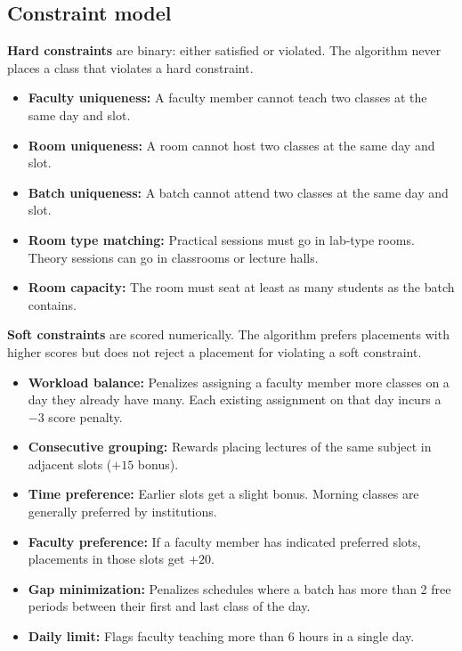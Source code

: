 \documentclass[conference]{IEEEtran}
\begin{document}
\subsection{Constraint model}

\textbf{Hard constraints} are binary: either satisfied or violated. The algorithm never places a class that violates a hard constraint.

\begin{itemize}
\item \textbf{Faculty uniqueness:} A faculty member cannot teach two classes at the same day and slot.
\item \textbf{Room uniqueness:} A room cannot host two classes at the same day and slot.
\item \textbf{Batch uniqueness:} A batch cannot attend two classes at the same day and slot.
\item \textbf{Room type matching:} Practical sessions must go in lab-type rooms. Theory sessions can go in classrooms or lecture halls.
\item \textbf{Room capacity:} The room must seat at least as many students as the batch contains.
\end{itemize}

\textbf{Soft constraints} are scored numerically. The algorithm prefers placements with higher scores but does not reject a placement for violating a soft constraint.

\begin{itemize}
\item \textbf{Workload balance:} Penalizes assigning a faculty member more classes on a day they already have many. Each existing assignment on that day incurs a $-3$ score penalty.
\item \textbf{Consecutive grouping:} Rewards placing lectures of the same subject in adjacent slots ($+15$ bonus).
\item \textbf{Time preference:} Earlier slots get a slight bonus. Morning classes are generally preferred by institutions.
\item \textbf{Faculty preference:} If a faculty member has indicated preferred slots, placements in those slots get $+20$.
\item \textbf{Gap minimization:} Penalizes schedules where a batch has more than 2 free periods between their first and last class of the day.
\item \textbf{Daily limit:} Flags faculty teaching more than 6 hours in a single day.
\end{itemize}
\end{document}

